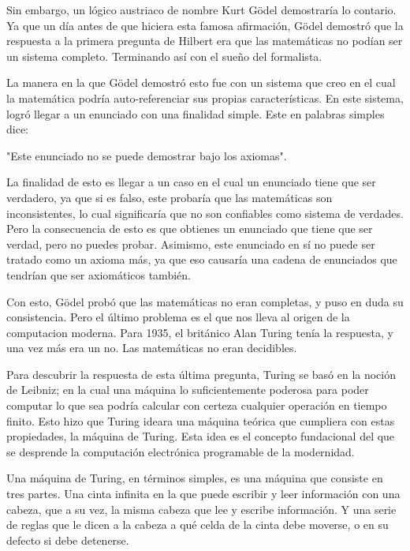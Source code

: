 \documentclass{article}
\begin{document}
    Sin embargo, un lógico austriaco de nombre Kurt Gödel demostraría lo contario. Ya que un día antes de que hiciera 
    esta famosa afirmación, Gödel demostró que la respuesta a la primera pregunta de Hilbert era que las matemáticas
    no podían ser un sistema completo. Terminando así con el sueño del formalista.

    La manera en la que Gödel demostró esto fue con un sistema que creo en el cual la matemática podría auto-referenciar 
    sus propias características. En este sistema, logró llegar a un enunciado con una finalidad simple. Este en palabras
    simples dice: 
    \begin{center}

    "Este enunciado no se puede demostrar bajo los axiomas". 

    \end{center}
    La finalidad de esto es llegar a un caso en el cual un enunciado tiene que ser verdadero, ya que si es falso, este probaría que 
    las matemáticas son inconsistentes, lo cual significaría que no son confiables como sistema de verdades. Pero la consecuencia de esto 
    es que obtienes un enunciado que tiene que ser verdad, pero no puedes probar. Asimismo, este enunciado en sí no puede ser tratado como 
    un axioma más, ya que eso causaría una cadena de enunciados que tendrían que ser axiomáticos también.

    Con esto, Gödel probó que las matemáticas no eran completas, y puso en duda su consistencia. Pero el último problema es el que nos lleva al 
    origen de la computacion moderna. Para 1935, el británico Alan Turing tenía la respuesta, y una vez más era un no. Las matemáticas no eran
    decidibles.

    Para descubrir la respuesta de esta última pregunta, Turing se basó en la noción de Leibniz; en la cual una máquina lo suficientemente poderosa
    para poder computar lo que sea podría calcular con certeza cualquier operación en tiempo finito. Esto hizo que Turing ideara una máquina teórica 
    que cumpliera con estas propiedades, la máquina de Turing. Esta idea es el concepto fundacional del que se desprende la computación electrónica 
    programable de la modernidad.

    Una máquina de Turing, en términos simples, es una máquina que consiste en tres partes. Una cinta infinita en la que puede escribir y leer información
    con una cabeza, que a su vez, la misma cabeza que lee y escribe información. Y una serie de reglas que le dicen a la cabeza a qué celda de la cinta debe 
    moverse, o en su defecto si debe detenerse.
\end{document}
